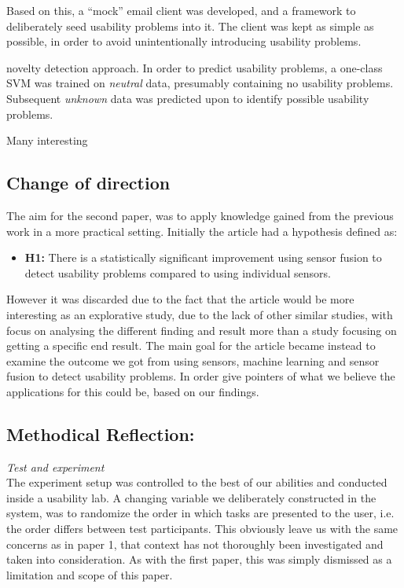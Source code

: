Based on this, a ``mock'' email client was developed, and a framework to deliberately seed
usability problems into it. The client was kept as simple as possible, in order to avoid unintentionally introducing
usability problems.
 
novelty detection approach.
In order to predict usability problems, a one-class SVM was trained on \textit{neutral} data, presumably containing no
usability problems. Subsequent \textit{unknown} data was predicted upon to identify possible usability problems.

Many interesting 

\subsection{Change of direction}
The aim for the second paper, was to apply knowledge gained from the previous work in a more practical setting. 
Initially the article had a hypothesis defined as:
\begin{itemize}
    \item \textbf{H1:} There is a statistically significant improvement using sensor fusion to detect usability problems compared to using individual sensors.
\end{itemize}
However it was discarded due to the fact that the article would be more interesting as an explorative study, due to the lack of other similar studies, with focus on analysing the different finding and result more than a study focusing on getting a specific end result.
The main goal for the article became instead to examine the outcome we got from using sensors, machine learning and sensor fusion to detect usability problems.
In order give pointers of what we believe the applications for this could be, based on our findings.

\subsection{Methodical Reflection:}
\textit{Test and experiment}\\
The experiment setup was controlled to the best of our abilities and conducted inside a usability lab. A changing
variable we deliberately constructed in the system, was to randomize the order in which tasks are presented to the user,
i.e. the order differs between test participants.
This obviously leave us with the same concerns as in paper 1, that context has not thoroughly been investigated and taken
into consideration. As with the first paper, this was simply dismissed as a limitation and scope of this paper.

